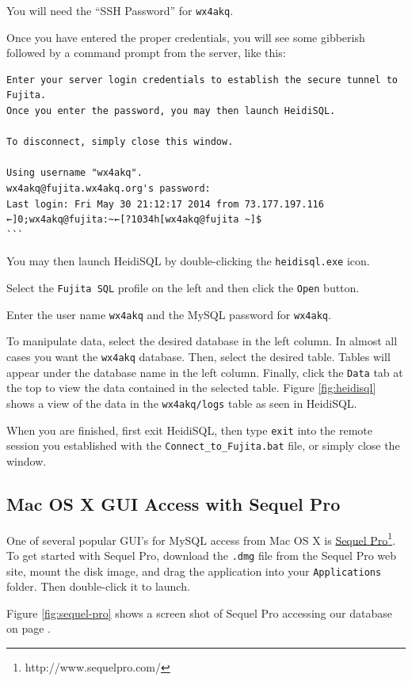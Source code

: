 \documentclass[pdflatex,letterpaper,twoside,12pt]{book}
\begin{document}
You will need the ``SSH Password'' for \texttt{wx4akq}.

\pagebreak
Once you have entered the proper credentials, you will see some gibberish followed by a command prompt from the server, like this:

\begin{verbatim}
Enter your server login credentials to establish the secure tunnel to Fujita.
Once you enter the password, you may then launch HeidiSQL.

To disconnect, simply close this window.

Using username "wx4akq".
wx4akq@fujita.wx4akq.org's password:
Last login: Fri May 30 21:12:17 2014 from 73.177.197.116
←]0;wx4akq@fujita:~←[?1034h[wx4akq@fujita ~]$
```
\end{verbatim}

You may then launch HeidiSQL by double-clicking the \texttt{heidisql.exe} icon.

Select the \texttt{Fujita SQL} profile on the left and then click the \texttt{Open} button.

Enter the user name \texttt{wx4akq} and the MySQL password for \texttt{wx4akq}.

To manipulate data, select the desired database in the left column.  In almost all cases you want the \texttt{wx4akq} database.  Then, select the desired table.  Tables will appear under the database name in the left column.  Finally, click the \texttt{Data} tab at the top to view the data contained in the selected table.  Figure \ref{fig:heidisql} shows a view of the data in the \texttt{wx4akq/logs} table as seen in HeidiSQL.

When you are finished, first exit HeidiSQL, then type \texttt{exit} into the remote session you established with the \texttt{Connect\_to\_Fujita.bat} file, or simply close the window.

\subsection{Mac OS X GUI Access with Sequel Pro}

One of several popular GUI's for MySQL access from Mac OS X is \href{http://www.sequelpro.com/}{Sequel Pro}\footnote{http://www.sequelpro.com/}.  To get started with Sequel Pro, download the \texttt{.dmg} file from the Sequel Pro web site, mount the disk image, and drag the application into your \texttt{Applications} folder.  Then double-click it to launch.

Figure \ref{fig:sequel-pro} shows a screen shot of Sequel Pro accessing our database on page \pageref{fig:sequel-pro}.
\end{document}
